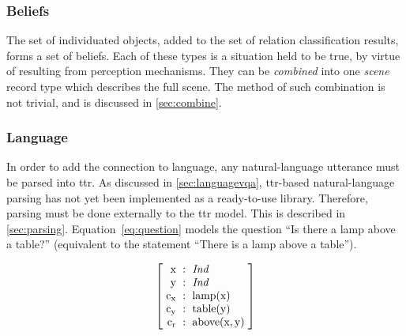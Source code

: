 \subsubsection{Beliefs}

The set of individuated objects, added to the set of relation classification results, forms a set of beliefs.
Each of these types is a situation held to be true, by virtue of resulting from perception mechanisms.
They can be \textit{combined} into one \textit{scene} record type which describes the full scene.
The method of such combination is not trivial, and is discussed in \autoref{sec:combine}.



\subsubsection{Language}
\label{sec:ttrlanguage}

%

In order to add the  connection to language, any natural-language utterance must be parsed into \gls{ttr}.
As discussed in \autoref{sec:languagevqa}, \gls{ttr}-based natural-language parsing has not yet been implemented as a ready-to-use library.
Therefore, parsing must be done externally to the \gls{ttr} model.
This is described in \autoref{sec:parsing}.
Equation~\ref{eq:question} models the question ``Is there a lamp above a table?'' (equivalent to the statement ``There is a lamp above a table'').

\begin{equation}\label{eq:question}
\rec{
    \text{x} &:& \type{Ind} \\
    \text{y} &:& \type{Ind} \\
    \text{c}_\text{x} &:& \text{lamp}(\text{x}) \\
    \text{c}_\text{y} &:& \text{table}(\text{y}) \\
    \text{c}_\text{r} &:& \text{above}(\text{x}, \text{y}) \\
    }
\end{equation}

